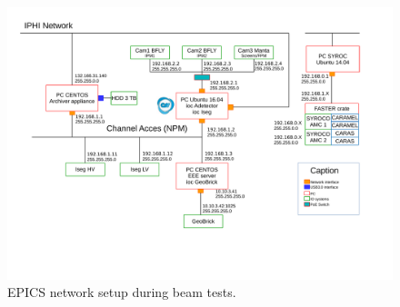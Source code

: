 \begin{figure}[!ht]
	\begin{center}
		\includegraphics[width=\textwidth]{04_IPHI_Test/figures/fig000_EPICS_IPHI}
	\end{center}
	\caption[EPICS network setup during beam tests]{EPICS network setup during beam tests.}
	\label{chap4:EPICS_IPHI}
\end{figure}
